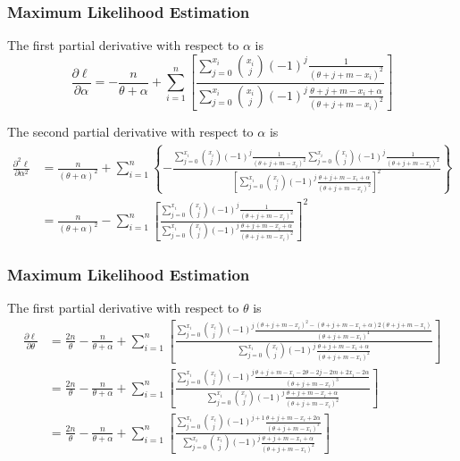 \documentclass{beamer}
\begin{document}
\begin{frame}
\frametitle{Maximum Likelihood Estimation}
\small
The first partial derivative with respect to $\alpha$ is
\[
\frac{\partial \ell}{\partial \alpha}= -\frac{n}{\theta+\alpha} + \sum\limits_{i=1}^n \left[ \frac{\sum_{j=0}^{x_{i}} {x_{i} \choose j} (-1)^{j} \frac{1}{(\theta+j+m-x_{i})^2}}{\sum_{j=0}^{x_{i}} {x_{i} \choose j} (-1)^{j} \frac{\theta+j+m-x_{i}+\alpha}{(\theta+j+m-x_{i})^2}} \right]
\]
\bigskip

The second partial derivative with respect to $\alpha$ is
\[
\begin{split}
\frac{\partial^2 \ell}{\partial \alpha^2}&= \frac{n}{(\theta+\alpha)^2} + \sum\limits_{i=1}^n \left\lbrace  -\frac{\sum_{j=0}^{x_{i}} {x_{i} \choose j} (-1)^j \frac{1}{(\theta+j+m-x_{i})^2} \sum_{j=0}^{x_{i}} {x_{i} \choose j} (-1)^j \frac{1}{(\theta+j+m-x_{i})^2}} {\left[ \sum_{j=0}^{x_{i}} {x_{i} \choose j} (-1)^j \frac{\theta+j+m-x_{i}+\alpha}{(\theta+j+m-x_{i})^2} \right]^2}  \right\rbrace \\
&= \frac{n}{(\theta+\alpha)^2} - \sum\limits_{i=1}^n \left[ \frac{\sum_{j=0}^{x_{i}} {x_{i} \choose j} (-1)^j \frac{1}{(\theta+j+m-x_{i})^2}}{\sum_{j=0}^{x_{i}} {x_{i} \choose j} (-1)^{j} \frac{\theta+j+m-x_{i}+\alpha}{(\theta+j+m-x_{i})^2}} \right]^2
\end{split}
\]
\end{frame}

\begin{frame}
\frametitle{Maximum Likelihood Estimation}
\small
The first partial derivative with respect to $\theta$ is
\[
\begin{split}
\frac{\partial \ell}{\partial \theta}&= \frac{2n}{\theta} - \frac{n}{\theta+\alpha} + \sum\limits_{i=1}^n \left[ \frac{\sum_{j=0}^{x_{i}} {x_{i} \choose j} (-1)^{j} \frac{(\theta+j+m-x_{i})^2 - (\theta+j+m-x_{i}+\alpha)2(\theta+j+m-x_{i})}{(\theta+j+m-x_{i})^4}}{\sum_{j=0}^{x_{i}} {x_{i} \choose j} (-1)^{j} \frac{\theta+j+m-x_{i}+\alpha}{(\theta+j+m-x_{i})^2}} \right] \\
&= \frac{2n}{\theta} - \frac{n}{\theta+\alpha} + \sum\limits_{i=1}^n \left[  \frac{\sum_{j=0}^{x_{i}} {x_{i} \choose j} (-1)^{j} \frac{\theta+j+m-x_{i} - 2\theta-2j-2m+2x_{i}-2\alpha}{(\theta+j+m-x_{i})^3}}{\sum_{j=0}^{x_{i}} {x_{i} \choose j} (-1)^{j} \frac{\theta+j+m-x_{i}+\alpha}{(\theta+j+m-x_{i})^2}} \right] \\
&= \frac{2n}{\theta} - \frac{n}{\theta+\alpha} + \sum\limits_{i=1}^n \left[  \frac{\sum_{j=0}^{x_{i}} {x_{i} \choose j} (-1)^{j+1} \frac{\theta+j+m-x_{i}+2\alpha}{(\theta+j+m-x_{i})^3}}{\sum_{j=0}^{x_{i}} {x_{i} \choose j} (-1)^{j} \frac{\theta+j+m-x_{i}+\alpha}{(\theta+j+m-x_{i})^2}} \right]
\end{split}
\]
\end{frame}
\end{document}
